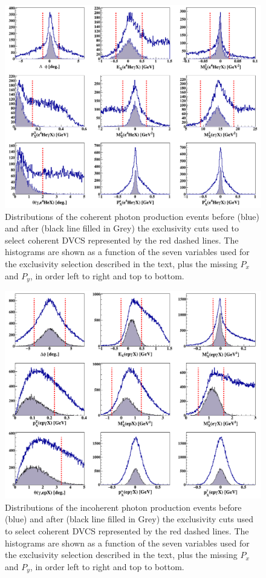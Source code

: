 \documentclass{article}
\begin{document}
\begin{figure}[tbp!]
\center
\includegraphics[trim=10 10 10 5,clip,width=16.5cm]{fig3/all_coh_exc_cuts.png}
        \caption{Distributions of the coherent photon production events before 
        (blue) and after (black line filled
	in Grey) the exclusivity cuts used to select coherent DVCS represented by the 
	red dashed lines. The histograms are shown as a function of the 
	seven variables used for the exclusivity selection described in the text, 
	plus the missing $P_x$ and $P_y$, in order left to right and top to bottom. 
	}
\label{fig:CohExcCuts}
\end{figure}

\begin{figure}[tbp!]
\center
\includegraphics[trim=10 10 10 
   5,clip,width=16.5cm]{fig3/all_incoh_exc_cuts.png}
\caption{Distributions of the incoherent photon production events before (blue) 
   and after (black line filled
	in Grey) the exclusivity cuts used to select coherent DVCS represented by the 
	red dashed lines. The histograms are shown as a function of the 
	seven variables used for the exclusivity selection described in the text, 
	plus the missing $P_x$ and $P_y$, in order left to right and top to bottom.}
\label{fig:IncExcCuts}
\end{figure}
\end{document}
